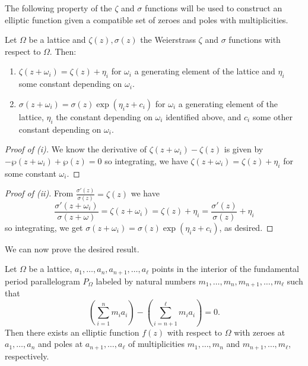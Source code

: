 The following property of the $\zeta$ and $\sigma$ functions will be used to construct an elliptic function given a compatible set of zeroes and poles with multiplicities. 
\begin{proposition}\label{prop: properties of zeta and sigma functions}
    Let $\Omega$ be a lattice and $\zeta(z),\sigma(z)$ the Weierstrass $\zeta$ and $\sigma$ functions with respect to $\Omega$. Then:
    \begin{enumerate}[label=(\roman*)]
        \item $\zeta(z+\omega_{i})=\zeta(z)+\eta_{i}$ for $\omega_{i}$ a generating element of the lattice and $\eta_{i}$ some constant depending on $\omega_{i}$. 
        \item $\sigma(z+\omega_{i})=\sigma(z)\exp(\eta_{i}z+c_{i})$ for $\omega_{i}$ a generating element of the lattice, $\eta_{i}$ the constant depending on $\omega_{i}$ identified above, and $c_{i}$ some other constant depending on $\omega_{i}$.
    \end{enumerate}
\end{proposition}
\begin{proof}[Proof of (i)]
    We know the derivative of $\zeta(z+\omega_{i})-\zeta(z)$ is given by $-\wp(z+\omega_{i})+\wp(z)=0$ so integrating, we have $\zeta(z+\omega_{i})=\zeta(z)+\eta_{i}$ for some constant $\omega_{i}$. 
\end{proof}
\begin{proof}[Proof of (ii)]
    From $\frac{\sigma'(z)}{\sigma(z)}=\zeta(z)$ we have 
    $$\frac{\sigma'(z+\omega_{i})}{\sigma(z+\omega)}=\zeta(z+\omega_{i})=\zeta(z)+\eta_{i}=\frac{\sigma'(z)}{\sigma(z)}+\eta_{i}$$
    so integrating, we get $\sigma(z+\omega_{i})=\sigma(z)\exp(\eta_{i}z+c_{i})$, as desired. 
\end{proof}
We can now prove the desired result. 
\begin{theorem}\label{thm: construction of elliptic function with given zeroes and poles}
    Let $\Omega$ be a lattice, $a_{1},\dots,a_{n},a_{n+1},\dots,a_{\ell}$ points in the interior of the fundamental period parallelogram $P_{\Omega}$ labeled by natural numbers $m_{1},\dots,m_{n},m_{n+1},\dots,m_{\ell}$ such that 
    $$\left(\sum_{i=1}^{n}m_{i}a_{i}\right)-\left(\sum_{i=n+1}^{\ell}m_{i}a_{i}\right)=0.$$
    Then there exists an elliptic function $f(z)$ with respect to $\Omega$ with zeroes at $a_{1},\dots,a_{n}$ and poles at $a_{n+1},\dots,a_{\ell}$ of multiplicities $m_{1},\dots,m_{n}$ and $m_{n+1},\dots,m_{\ell}$, respectively. 
\end{theorem}
